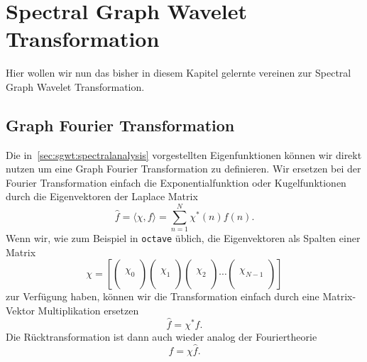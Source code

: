 
\section{Spectral Graph Wavelet Transformation\label{sec:sgwt:wavelets}}

Hier wollen wir nun das bisher in diesem Kapitel gelernte vereinen zur Spectral 
Graph Wavelet Transformation.

\subsection{Graph Fourier Transformation\label{subsec:sgwt:gft}}

Die in~\cref{sec:sgwt:spectralanalysis} vorgestellten Eigenfunktionen 
k\"onnen wir direkt nutzen um eine Graph Fourier Transformation zu definieren. 
Wir ersetzen bei der Fourier Transformation einfach die Exponentialfunktion 
oder Kugelfunktionen durch die Eigenvektoren der Laplace Matrix
\begin{equation*}
\hat{f} = \langle \chi, f \rangle = \sum_{n = 1}^{N} \chi^*(n)f(n).
\end{equation*}
Wenn wir, wie zum Beispiel in \texttt{octave} \"ublich, die Eigenvektoren als 
Spalten einer Matrix
\begin{equation}
\chi = 
\left[
\begin{pmatrix}\\\chi_0\\\\\end{pmatrix}
\begin{pmatrix}\\\chi_1\\\\\end{pmatrix}
\begin{pmatrix}\\\chi_2\\\\\end{pmatrix}
\cdots
\begin{pmatrix}\\\chi_{N-1}\\\\\end{pmatrix}
\right]
\end{equation}
zur Verf\"ugung haben, k\"onnen wir die Transformation 
einfach durch eine Matrix-Vektor Multiplikation ersetzen
\begin{equation*}
\hat{f} = \chi^* f.
\end{equation*}
Die R\"ucktransformation ist dann auch wieder analog der Fouriertheorie
\begin{equation*}
f = \chi \hat{f}.
\end{equation*}


